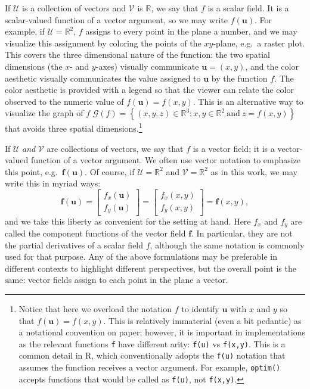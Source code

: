 If \(\mathcal{U}\) is a collection of vectors and \(\mathcal{V}\) is \(\mathbb{R}\), we say that \(f\) is a scalar field. It is a scalar-valued function of a vector argument, so we may write \(f(\mathbf{u})\). For example, if \(\mathcal{U} = \mathbb{R}^{2}\), \(f\) assigns to every point in the plane a number, and we may visualize this assignment by coloring the points of the \(xy\)-plane, e.g.~a raster plot. This covers the three dimensional nature of the function: the two spatial dimensions (the \(x\)- and \(y\)-axes) visually communicate \(\mathbf{u} = (x,y)\), and the color aesthetic visually communicates the value assigned to \(\mathbf{u}\) by the function \(f\). The color aesthetic is provided with a legend so that the viewer can relate the color observed to the numeric value of \(f(\mathbf{u}) = f(x,y)\). This is an alternative way to visualize the graph of \(f\) \(\mathcal{G}(f) = \left\{(x,y,z) \in \mathbb{R}^{3}: x, y \in \mathbb{R}^{2}~\mbox{and}~z = f(x,y)\right\}\) that avoids three spatial dimensions.\footnote{Notice that here we overload the notation \(f\) to identify \(\mathbf{u}\) with \(x\) and \(y\) so that \(f(\mathbf{u}) = f(x,y)\). This is relatively immaterial (even a bit pedantic) as a notational convention on paper; however, it is important in implementations as the relevant functions \texttt{f} have different arity: \texttt{f(u)} vs \texttt{f(x,y)}. This is a common detail in R, which conventionally adopts the \texttt{f(u)} notation that assumes the function receives a vector argument. For example, \texttt{optim()} accepts functions that would be called as \texttt{f(u)}, not \texttt{f(x,y)}.}

If \(\mathcal{U}\) \emph{and} \(\mathcal{V}\) are collections of vectors, we say that \(f\) is a vector field; it is a vector-valued function of a vector argument. We often use vector notation to emphasize this point, e.g.~\(\mathbf{f}(\mathbf{u})\). Of course, if \(\mathcal{U} = \mathbb{R}^{2}\) and \(\mathcal{V} = \mathbb{R}^{2}\) as in this work, we may write this in myriad ways:
\[\mathbf{f}(\mathbf{u}) = \begin{bmatrix}f_{x}(\mathbf{u})\\f_{y}(\mathbf{u})\end{bmatrix} = \begin{bmatrix}f_{x}(x,y)\\f_{y}(x,y)\end{bmatrix} = \mathbf{f}(x,y),\]
and we take this liberty as convenient for the setting at hand. Here \(f_{x}\) and \(f_{y}\) are called the component functions of the vector field \(\mathbf{f}\). In particular, they are not the partial derivatives of a scalar field \(f\), although the same notation is commonly used for that purpose. Any of the above formulations may be preferable in different contexts to highlight different perspectives, but the overall point is the same: vector fields assign to each point in the plane a vector.

